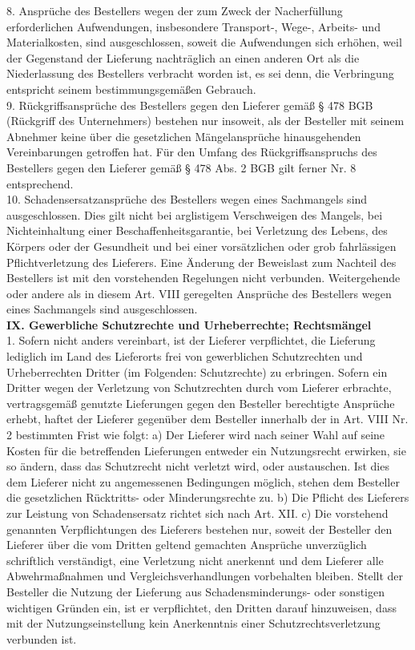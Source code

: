 \begin{multicols}{2}
\begin{scriptsize}
	8. Ansprüche des Bestellers wegen der zum Zweck der Nacherfüllung erforderlichen Aufwendungen, insbesondere Transport-, Wege-, Arbeits- und Materialkosten, sind ausgeschlossen, soweit die Aufwendungen sich erhöhen, weil der Gegenstand der Lieferung nachträglich an einen anderen Ort als die Niederlassung des Bestellers verbracht worden ist, es sei denn, die Verbringung entspricht seinem bestimmungsgemäßen Gebrauch.\\
	9. Rückgriffsansprüche des Bestellers gegen den Lieferer gemäß § 478 BGB (Rückgriff des Unternehmers) bestehen nur insoweit, als der Besteller mit seinem Abnehmer keine über die gesetzlichen Mängelansprüche hinausgehenden Vereinbarungen getroffen hat. Für den Umfang des Rückgriffsanspruchs des Bestellers gegen den Lieferer gemäß § 478 Abs. 2 BGB gilt ferner Nr. 8 entsprechend.\\
	10. Schadensersatzansprüche des Bestellers wegen eines Sachmangels sind ausgeschlossen. Dies gilt nicht bei arglistigem Verschweigen des Mangels, bei Nichteinhaltung einer Beschaffenheitsgarantie, bei Verletzung des Lebens, des Körpers oder der Gesundheit und bei einer vorsätzlichen oder grob fahrlässigen Pflichtverletzung des Lieferers. Eine Änderung der Beweislast zum Nachteil des Bestellers ist mit den vorstehenden Regelungen nicht verbunden. Weitergehende oder andere als in diesem Art. VIII geregelten Ansprüche des Bestellers wegen eines Sachmangels sind ausgeschlossen.\\
	\textbf{IX. Gewerbliche Schutzrechte und Urheberrechte; Rechtsmängel}\\
	1. Sofern nicht anders vereinbart, ist der Lieferer verpflichtet, die Lieferung lediglich im Land des Lieferorts frei von gewerblichen Schutzrechten und Urheberrechten Dritter (im Folgenden: Schutzrechte) zu erbringen. Sofern ein Dritter wegen der Verletzung von Schutzrechten durch vom Lieferer erbrachte, vertragsgemäß genutzte Lieferungen gegen den Besteller berechtigte Ansprüche erhebt, haftet der Lieferer gegenüber dem Besteller innerhalb der in Art. VIII Nr. 2 bestimmten Frist wie folgt: a) Der Lieferer wird nach seiner Wahl auf seine Kosten für die betreffenden Lieferungen entweder ein Nutzungsrecht erwirken, sie so ändern, dass das Schutzrecht nicht verletzt wird, oder austauschen. Ist dies dem Lieferer nicht zu angemessenen Bedingungen möglich, stehen dem Besteller die gesetzlichen Rücktritts- oder Minderungsrechte zu. b) Die Pflicht des Lieferers zur Leistung von Schadensersatz richtet sich nach Art. XII. c) Die vorstehend genannten Verpflichtungen des Lieferers bestehen nur, soweit der Besteller den Lieferer über die vom Dritten geltend gemachten Ansprüche unverzüglich schriftlich verständigt, eine Verletzung nicht anerkennt und dem Lieferer alle Abwehrmaßnahmen und Vergleichsverhandlungen vorbehalten bleiben. Stellt der Besteller die Nutzung der Lieferung aus Schadensminderungs- oder sonstigen wichtigen Gründen ein, ist er verpflichtet, den Dritten darauf hinzuweisen, dass mit der Nutzungseinstellung kein Anerkenntnis einer Schutzrechtsverletzung verbunden ist.\\

\end{scriptsize}
\end{multicols}
